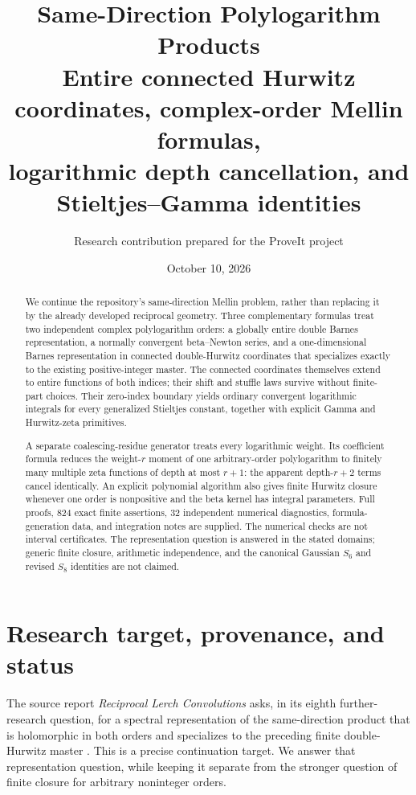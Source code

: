 \documentclass[11pt]{article}
\title{Same-Direction Polylogarithm Products\\[3pt]
\large Entire connected Hurwitz coordinates, complex-order Mellin formulas,\\
logarithmic depth cancellation, and Stieltjes--Gamma identities}
\author{Research contribution prepared for the ProveIt project}
\date{October 10, 2026}
\numberwithin{equation}{section}
\theoremstyle{definition}
\begin{document}
\maketitle
\begin{abstract}
We continue the repository's same-direction Mellin problem, rather than replacing it by the already developed reciprocal geometry. Three complementary formulas treat two independent complex polylogarithm orders: a globally entire double Barnes representation, a normally convergent beta--Newton series, and a one-dimensional Barnes representation in connected double-Hurwitz coordinates that specializes exactly to the existing positive-integer master. The connected coordinates themselves extend to entire functions of both indices; their shift and stuffle laws survive without finite-part choices. Their zero-index boundary yields ordinary convergent logarithmic integrals for every generalized Stieltjes constant, together with explicit Gamma and Hurwitz-zeta primitives.

A separate coalescing-residue generator treats every logarithmic weight. Its coefficient formula reduces the weight-$r$ moment of one arbitrary-order polylogarithm to finitely many multiple zeta functions of depth at most $r+1$: the apparent depth-$r+2$ terms cancel identically. An explicit polynomial algorithm also gives finite Hurwitz closure whenever one order is nonpositive and the beta kernel has integral parameters. Full proofs, 824 exact finite assertions, 32 independent numerical diagnostics, formula-generation data, and integration notes are supplied. The numerical checks are not interval certificates. The representation question is answered in the stated domains; generic finite closure, arithmetic independence, and the canonical Gaussian $S_6$ and revised $S_8$ identities are not claimed.
\end{abstract}
\newpage
\tableofcontents
\newpage

\section{Research target, provenance, and status}\label{sec:scope}
The source report \emph{Reciprocal Lerch Convolutions} asks, in its eighth further-research question, for a spectral representation of the same-direction product that is holomorphic in both orders and specializes to the preceding finite double-Hurwitz master \cite{RLC,BMH}. This is a precise continuation target. We answer that representation question, while keeping it separate from the stronger question of finite closure for arbitrary noninteger orders.
\end{document}
